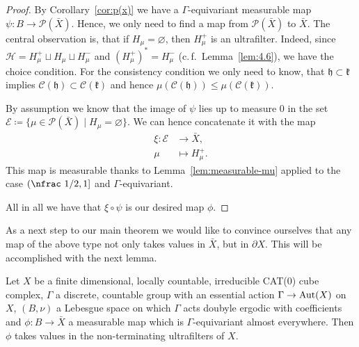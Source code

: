 \begin{proof}
  By Corollary~\ref{cor:p(x)} we have a \(\Gamma\)-equivariant measurable map \(\psi\colon B \to \mathcal{P}(\bar X)\). Hence, we only need to find a map from \(\mathcal{P}(\bar X)\) to \(\bar X\). The central observation is, that if \(H_\mu= \varnothing\), then \(H_\mu^+\) is an ultrafilter. Indeed, since \(\mathcal{H} = H_\mu^+ \sqcup H_\mu \sqcup H_\mu^-\) and \((H_\mu^+)^\ast = H_\mu^-\) (c.\,f.~Lemma~\ref{lem:4.6}), we have the choice condition. For the consistency condition we only need to know, that \(\mathfrak{h} \subset \mathfrak{k}\) implies \(\mathcal{C}(\mathfrak{h}) \subset \mathcal{C}(\mathfrak{k})\) and hence \(\mu(\mathcal{C}(\mathfrak{h}))\leq \mu(\mathcal{C}(\mathfrak{k}))\).

  By assumption we know that the image of \(\psi\) lies up to measure 0 in the set \(\mathcal{E} \coloneqq \{\mu \in \mathcal{P}(\bar X) \mid H_\mu = \varnothing\}\). We can hence concatenate it with the map
  \begin{align*}
    \xi\colon \mathcal{E} &\to \bar X,\\
    \mu &\mapsto H_\mu^+.
  \end{align*}
  This map is measurable thanks to Lemma~\ref{lem:measurable-mu} applied to the case \({(\text{\nfrac 1/2}, 1]}\) and \(\Gamma\)-equivariant.

  All in all we have that \(\xi \circ \psi\) is our desired map \(\phi\).
\end{proof}

As a next step to our main theorem we would like to convince ourselves that any map of the above type not only takes values in \(\bar X\), but in \(\partial X\). This will be accomplished with the next lemma.

\begin{lemma}[{\cite[Lemma~4.11]{MR3509968}}]
  \label{lem:4.11}
  Let \(X\) be a finite dimensional, locally countable, irreducible CAT(0) cube complex, \(\Gamma\) a discrete, countable group with an essential action \(\Gamma \to \operatorname{Aut}(X)\) on \(X\), \((B, \nu)\) a Lebesgue space on which \(\Gamma\) acts doubyle ergodic with coefficients and \(\phi\colon B \to \bar X\) a measurable map which is \(\Gamma\)-equivariant almost everywhere. Then \(\phi\) takes values in the non-terminating ultrafilters of \(X\).
\end{lemma}

